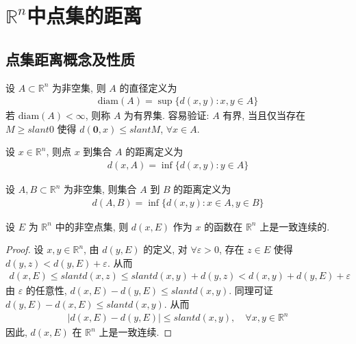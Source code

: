\documentclass[../../main.tex]{subfiles}
\begin{document}
\section{$\mathbb{R}^n$中点集的距离}

\subsection{点集距离概念及性质}

\begin{definition}
设 $A \subset \mathbb{R}^n$ 为非空集, 则 $A$ 的直径定义为
\begin{align*}
\mathrm{diam}(A) = \sup\{d(x, y) : x, y \in A\}
\end{align*}
若 $\mathrm{diam}(A) < \infty$, 则称 $A$ 为有界集. 容易验证: $A$ 有界, 当且仅当存在 $M \geqslant slant 0$ 使得 $d(\mathbf{0}, x) \leqslant slant M$, $\forall x \in A$.

设 $x \in \mathbb{R}^n$, 则点 $x$ 到集合 $A$ 的距离定义为
\begin{align*}
d(x, A) = \inf\{d(x, y) : y \in A\}
\end{align*}

设 $A, B \subset \mathbb{R}^n$ 为非空集, 则集合 $A$ 到 $B$ 的距离定义为
\begin{align*}
d(A, B) = \inf\{d(x, y) : x \in A, y \in B\}
\end{align*}
\end{definition}

\begin{proposition}\label{proposition:点与集合之间的距离函数在R^n上一致连续}
设 $E$ 为 $\mathbb{R}^n$ 中的非空点集, 则 $d(x, E)$ 作为 $x$ 的函数在 $\mathbb{R}^n$ 上是一致连续的.
\end{proposition}
\begin{proof}
设 $x, y \in \mathbb{R}^n$, 由 $d(y, E)$ 的定义, 对 $\forall \varepsilon > 0$, 存在 $z \in E$ 使得 $d(y, z) < d(y, E) + \varepsilon$. 从而
\begin{align*}
d(x, E) \leqslant slant d(x, z) \leqslant slant d(x, y) + d(y, z) < d(x, y) + d(y, E) + \varepsilon
\end{align*}
由 $\varepsilon$ 的任意性, $d(x, E) - d(y, E) \leqslant slant d(x, y)$. 同理可证 $d(y, E) - d(x, E) \leqslant slant d(x, y)$. 从而
\begin{align*}
|d(x, E) - d(y, E)| \leqslant slant d(x, y), \quad \forall x, y \in \mathbb{R}^n
\end{align*}
因此, $d(x, E)$ 在 $\mathbb{R}^n$ 上是一致连续.
\end{proof}
\end{document}

